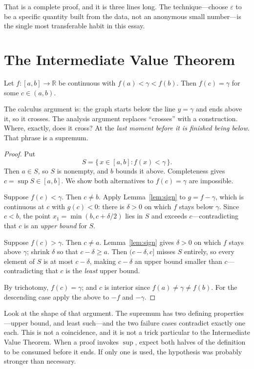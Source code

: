 \documentclass{essay}
\begin{document}
That is a complete proof, and it is three lines long. The technique---choose $\varepsilon$ to be a specific quantity built from the data, not an anonymous small number---is the single most transferable habit in this essay.

\section{The Intermediate Value Theorem}

\begin{theorem}\label{thm:ivt}
Let $f : [a,b] \to \mathbb{R}$ be continuous with $f(a) < \gamma < f(b)$. Then $f(c) = \gamma$ for some $c \in (a,b)$.
\end{theorem}

The calculus argument is: the graph starts below the line $y = \gamma$ and ends above it, so it crosses. The analysis argument replaces ``crosses'' with a construction. Where, exactly, does it cross? At the \emph{last moment before it is finished being below}. That phrase is a supremum.

\begin{proof}
Put
\[
S = \{\, x \in [a,b] : f(x) < \gamma \,\}.
\]
Then $a \in S$, so $S$ is nonempty, and $b$ bounds it above. Completeness gives $c = \sup S \in [a,b]$. We show both alternatives to $f(c) = \gamma$ are impossible.

Suppose $f(c) < \gamma$. Then $c \neq b$. Apply Lemma~\ref{lem:sign} to $g = f - \gamma$, which is continuous at $c$ with $g(c) < 0$: there is $\delta > 0$ on which $f$ stays below $\gamma$. Since $c < b$, the point $x_{1} = \min(b, c + \delta/2)$ lies in $S$ and exceeds $c$---contradicting that $c$ is an \emph{upper bound} for $S$.

Suppose $f(c) > \gamma$. Then $c \neq a$. Lemma~\ref{lem:sign} gives $\delta > 0$ on which $f$ stays above $\gamma$; shrink $\delta$ so that $c - \delta \geq a$. Then $(c - \delta, c]$ misses $S$ entirely, so every element of $S$ is at most $c - \delta$, making $c - \delta$ an upper bound smaller than $c$---contradicting that $c$ is the \emph{least} upper bound.

By trichotomy, $f(c) = \gamma$; and $c$ is interior since $f(a) \neq \gamma \neq f(b)$. For the descending case apply the above to $-f$ and $-\gamma$.
\end{proof}

Look at the shape of that argument. The supremum has two defining properties---upper bound, and least such---and the two failure cases contradict exactly one each. This is not a coincidence, and it is not a trick particular to the Intermediate Value Theorem. When a proof invokes $\sup$, expect both halves of the definition to be consumed before it ends. If only one is used, the hypothesis was probably stronger than necessary.
\end{document}
